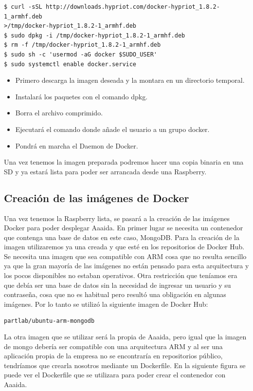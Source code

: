 \begin{verbatim}
$ curl -sSL http://downloads.hypriot.com/docker-hypriot_1.8.2-1_armhf.deb 
>/tmp/docker-hypriot_1.8.2-1_armhf.deb
$ sudo dpkg -i /tmp/docker-hypriot_1.8.2-1_armhf.deb
$ rm -f /tmp/docker-hypriot_1.8.2-1_armhf.deb
$ sudo sh -c 'usermod -aG docker $SUDO_USER'
$ sudo systemctl enable docker.service
\end{verbatim}

\begin{itemize}
\item Primero descarga la imagen deseada y la montara en un directorio temporal.
\item Instalará los paquetes con el comando dpkg.
\item Borra el archivo comprimido.
\item Ejecutará el comando donde añade el usuario a un grupo docker. 
\item Pondrá en marcha el Daemon de Docker.  
\end{itemize}

Una vez tenemos la imagen preparada podremos hacer una copia binaria en una SD y ya estará lista para poder ser arrancada desde una Raspberry. 

\subsection{Creación de las imágenes de Docker}

Una vez tenemos la Raspberry lista, se pasará a la creación de las imágenes Docker para poder desplegar Aaaida.
En primer lugar se necesita un contenedor que contenga una base de datos en este caso, MongoDB. Para la creación de la imagen utilizaremos ya una creada y que esté en los repositorios de Docker Hub. Se necesita una imagen que sea compatible con ARM cosa que no resulta sencillo ya que la gran mayoría de las imágenes no están pensado para esta arquitectura y los pocos disponibles no estaban operativos. Otra restricción que teníamos era que debía ser una base de datos sin la necesidad de ingresar un usuario y su contraseña, cosa que no es habitual pero resultó una obligación en algunas imágenes.
Por lo tanto se utilizó la siguiente imagen de Docker Hub:

\begin{center}
\texttt{partlab/ubuntu-arm-mongodb}
\end{center}

La otra imagen que se utilizar será la propia de Aaaida, pero igual que la imagen de mongo debería ser compatible con una arquitectura ARM y al ser una aplicación propia de la empresa no se encontraría en repositorios público, tendríamos que crearla nosotros mediante un Dockerfile. 
En la siguiente figura se puede ver el Dockerfile que se utilizara para poder crear el contenedor con Aaaida.

